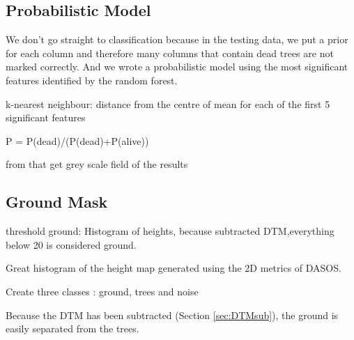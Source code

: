 \documentclass{subfiles}
\begin{document}
	
	
\subsection{Probabilistic Model}

\par We don't go straight to classification because in the testing data, we put a prior for each column and therefore many columns that contain dead trees are not marked correctly. And we wrote a probabilistic model using the most significant features identified by the random forest. 

 \par k-nearest neighbour: distance from the centre of mean for each of the first 5 significant features 
 \par P = P(dead)/(P(dead)+P(alive)) 
 \par from that get grey scale field of the results 



 
 

 
 
 \subsection{Ground Mask}
 \par threshold ground: Histogram of heights, because subtracted DTM,everything below 20 is considered ground. 
 \par Great histogram of the height map generated using the 2D metrics of DASOS. 
 
 \par Create three classes : ground, trees and noise
 
 \par Because the DTM has been subtracted (Section \ref{sec:DTMsub}), the ground is easily separated from the trees. 
 
\end{document}
